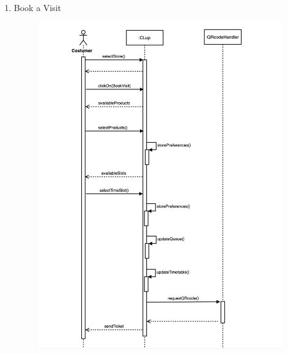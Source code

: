\documentclass[]{article}
\begin{document}
\begin{enumerate}
						\item Book a Visit
							\begin{figure}[H]
								\centering
								\includegraphics[scale=1.1]{BookAVisit.png}
								\caption{}
								\label{fig:bookavisit_sequencediagram}
							\end{figure}
							\newpage
							

\end{enumerate}
\end{document}
